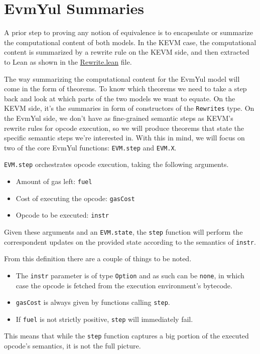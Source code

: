 \chapter{EvmYul Summaries}\label{chap:EvmYulSummaries}

A prior step to proving any notion of equivalence is to encapsulate or summarize
the computational content of both models. In the KEVM case, the computational
content is summarized by a rewrite rule on the KEVM side, and then extracted to
Lean as shown in the
\href{https://runtimeverification.github.io/evm-equivalence/docs/EvmEquivalence/KEVM2Lean/Rewrite.html}{Rewrite.lean}
file.

The way summarizing the computational content for the EvmYul model will come in
the form of theorems. To know which theorems we need to take a step back and
look at which parts of the two models we want to equate. On the KEVM side, it's
the summaries in form of constructors of the \texttt{Rewrites} type.
On the EvmYul side, we don't have as fine-grained semantic steps as KEVM's
rewrite rules for opcode execution, so we will produce theorems that state the
specific semantic steps we're interested in. With this in
mind, we will focus on two of the core EvmYul functions: \texttt{EVM.step} and
\texttt{EVM.X}.

\begin{definition}
\label{def:EVM.step}\leanok
\texttt{EVM.step} orchestrates opcode execution, taking the following arguments.
\begin{itemize}
\item Amount of gas left: \texttt{fuel}
\item Cost of executing the opcode: \texttt{gasCost}
\item Opcode to be executed: \texttt{instr}
\end{itemize}

Given these arguments and an \texttt{EVM.state}, the \texttt{step} function will
perform the correspondent updates on the provided state according to the
semantics of \texttt{instr}.
\end{definition}

From this definition there are a couple of things to be noted.
\begin{itemize}
\item The \texttt{instr} parameter is of type \texttt{Option} and as such
can be \texttt{none}, in which case the opcode is fetched from the execution
environment's bytecode.
\item \texttt{gasCost} is always given by functions calling \texttt{step}.
\item If \texttt{fuel} is not strictly positive, \texttt{step} will immediately fail.
\end{itemize}
This means that while the \texttt{step} function captures a big portion of the
executed opcode's semantics, it is not the full picture.

